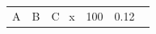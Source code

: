 \documentclass{article}
\begin{document}
\begin{tabular}{l S[table-format=4.0] S[table-format=2.2]}
A & {B} & {C} \
x & 100 & 0.12 \
\end{tabular}
\end{document}
